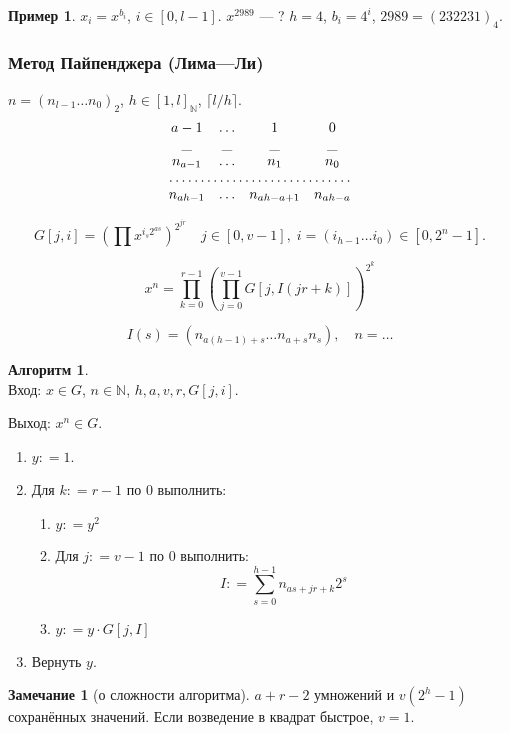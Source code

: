 \documentclass[12pt]{article}%
\newcommand{\N}{\ensuremath{\mathbb N}}
\newcommand{\coleq}{\ensuremath{\mathrel{\mathop:}=}}
\newcommand{\nspace}{\hspace{0pt}}
\theoremstyle{remark}
\theoremstyle{definition}
\newtheorem{Ex}{Пример}
\newtheorem*{Remark}{Замечание}
\newtheorem{NumAlgo}{Алгоритм}
\begin{document}
\begin{Ex}
$x_i = x^{b_i}$, $i \in [0, l-1]$. $x^{2989}$ — ? $h=4$, $b_i = 4^i$,
$ 2989 =(232231)_4$.
\begin{center}
%
\end{center}
\end{Ex}

\subsubsection{Метод Пайпенджера (Лима—Ли)}
$n = (n_{l-1} \ldots n_0)_2$, $h \in [1, l]_{\N}$, $\lceil l / h \rceil$.
$$
\begin{matrix}
    a - 1 & \ldots & 1 & 0 \\
    \_ & \_ & \_ & \_ \\
    n_{a-1} & \ldots & n_1 & n_0 \\
    \hdotsfor{4}\\
    n_{ah-1} & \ldots & n_{ah - a +1} & n_{ah - a} \\ 
\end{matrix}
$$

$$
    G[j, i] = \left (\prod x^{i_s 2^{as}} \right )^{2^{jr}} \quad
    j \in [0, v-1], \; i = (i_{h-1}\ldots i_0) \in [0, 2^n - 1]. 
$$


$$
    x^n = \prod_{k=0}^{r-1} \left ( 
        \prod_{j=0}^{v-1} G[j, I(jr+k)] 
    \right )^{2^k} 
$$

$$
    I(s) = (n_{a(h - 1) + s} \ldots n_{a + s} n_s), \quad n = \ldots 
$$

\begin{NumAlgo}\nspace\\

Вход: $x \in G$, $n \in \N$, $h,a,v,r,G[j,i]$. 

Выход: $x^n \in G$.

\begin{enumerate}
  \item $y \coleq 1$.
  \item Для $k \coleq r - 1$ по $0$ выполнить:
    \begin{enumerate}
        \item $y \coleq y^2$
        \item Для $j \coleq v - 1$ по $0$ выполнить:
        $$ I \coleq \sum_{s=0}^{h-1} n_{as + jr + k} 2^s$$
        \item $y \coleq y \cdot G[j, I]$ 
    \end{enumerate}
    \item Вернуть $y$.
\end{enumerate}
\end{NumAlgo}
\begin{Remark}[о сложности алгоритма]
$a + r - 2$ умножений и $v(2^h - 1)$ сохранённых значений. Если возведение в
квадрат быстрое, $v = 1$.
\end{Remark}
\end{document}
